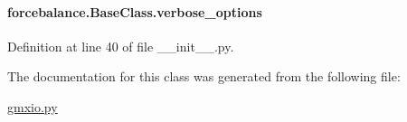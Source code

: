 \hypertarget{classforcebalance_1_1BaseClass_afd68efa29ccd2f320f4cf82198214aac}{
\paragraph[{verbose\-\_\-options}]{\setlength{\rightskip}{0pt plus 5cm}forcebalance.\-Base\-Class.\-verbose\-\_\-options\hspace{0.3cm}{\ttfamily [inherited]}}}\label{classforcebalance_1_1BaseClass_afd68efa29ccd2f320f4cf82198214aac}


Definition at line 40 of file \-\_\-\-\_\-init\-\_\-\-\_\-.\-py.



The documentation for this class was generated from the following file\-:\begin{DoxyCompactItemize}
\item 
\hyperlink{gmxio_8py}{gmxio.\-py}\end{DoxyCompactItemize}
